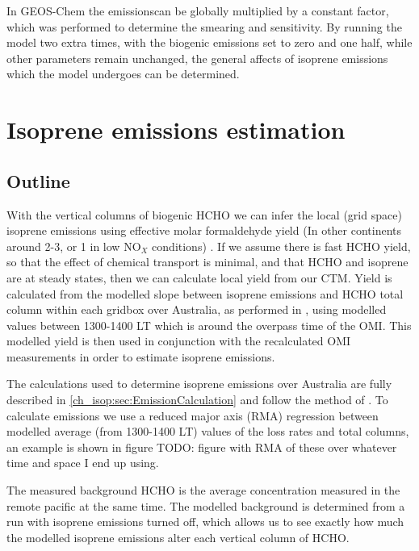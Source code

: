     In GEOS-Chem the emissionscan be globally multiplied by a constant factor, which was performed to determine the smearing and sensitivity.
    By running the model two extra times, with the biogenic emissions set to zero and one half, while other parameters remain unchanged, the general affects of isoprene emissions which the model undergoes can be determined.
    
\section{Isoprene emissions estimation}
\label{ch_isop:sec:IsopreneEmissions}

  \subsection{Outline}
   With the vertical columns of biogenic HCHO we can infer the local (grid space) isoprene emissions using effective molar formaldehyde yield (In other continents around 2-3, or 1 in low NO$_X$ conditions) \citep{Palmer2003,Marais2012,Bauwens2016}.
    If we assume there is fast HCHO yield, so that the effect of chemical transport is minimal, and that HCHO and isoprene are at steady states, then we can calculate local yield from our CTM.
   Yield is calculated from the modelled slope between isoprene emissions and HCHO total column within each gridbox over Australia, as performed in \cite{Palmer2003}, using modelled values between 1300-1400 LT which is around the overpass time of the OMI.
   This modelled yield is then used in conjunction with the recalculated OMI measurements in order to estimate isoprene emissions.
    
    The calculations used to determine isoprene emissions over Australia are fully described in \ref{ch_isop:sec:EmissionCalculation} and follow the method of \citet{Palmer2003}.
    To calculate emissions we use a reduced major axis (RMA) regression between modelled average (from 1300-1400 LT) values of the loss rates and total columns, an example is shown in figure TODO: figure with RMA of these over whatever time and space I end up using.
    
    The measured background HCHO is the average concentration measured in the remote pacific at the same time.
    The modelled background is determined from a run with isoprene emissions turned off, which allows us to see exactly how much the modelled isoprene emissions alter each vertical column of HCHO.
    
